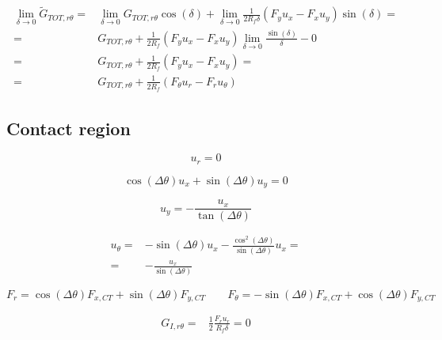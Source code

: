 \documentclass[a4paper]{jpconf}
\begin{document}
\begin{equation}
\begin{split}
\lim_{\delta\rightarrow 0}\widetilde{G}_{TOT,r\theta} = &\lim_{\delta\rightarrow 0}G_{TOT,r\theta}\cos\left(\delta\right)+\lim_{\delta\rightarrow 0}\frac{1}{2R_{f}\delta}\left(F_{y}u_{x}-F_{x}u_{y}\right)\sin\left(\delta\right)=\\
= &G_{TOT,r\theta}+\frac{1}{2R_{f}}\left(F_{y}u_{x}-F_{x}u_{y}\right)\lim_{\delta\rightarrow 0}\frac{\sin\left(\delta\right)}{\delta}-0\\
= &G_{TOT,r\theta}+\frac{1}{2R_{f}}\left(F_{y}u_{x}-F_{x}u_{y}\right)=\\
= &G_{TOT,r\theta}+\frac{1}{2R_{f}}\left(F_{\theta}u_{r}-F_{r}u_{\theta}\right)
\end{split}
\end{equation}

\subsection{Contact region}

\begin{equation}
u_{r}=0
\end{equation}

\begin{equation}
\cos\left(\Delta\theta\right) u_{x}+\sin\left(\Delta\theta\right) u_{y}=0
\end{equation}

\begin{equation}
u_{y}=-\frac{ u_{x}}{\tan\left(\Delta\theta\right)}
\end{equation}

\begin{equation}
\begin{split}
u_{\theta}=&-\sin\left(\Delta\theta\right) u_{x}-\frac{\cos^{2}\left(\Delta\theta\right)}{\sin\left(\Delta\theta\right)}u_{x}=\\
=&-\frac{u_{x}}{\sin\left(\Delta\theta\right)}
\end{split}
\end{equation}

\begin{equation}
F_{r}=\cos\left(\Delta\theta\right) F_{x,CT}+\sin\left(\Delta\theta\right) F_{y,CT}\qquad F_{\theta}=-\sin\left(\Delta\theta\right) F_{x,CT}+\cos\left(\Delta\theta\right) F_{y,CT}
\end{equation}

\begin{equation}
\begin{split}
G_{I,r\theta} = &\frac{1}{2}\frac{F_{r}u_{r}}{R_{f}\delta}=0
\end{split}
\end{equation}
\end{document}
